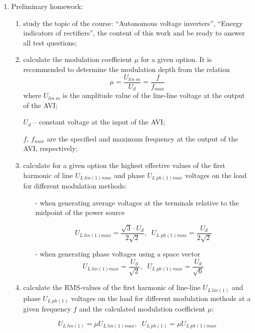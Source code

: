 \documentclass[a4paper,14pt]{article}
\begin{document}
\begin{enumerate}
\item Preliminary homework:
\begin{enumerate}
\item study the topic of the course: “Autonomous voltage inverters”, “Energy indicators of rectifiers”, the content of this work and be ready to answer all test questions;
\item calculate the modulation coefficient $\mu$ for a given option. It is recommended to determine the modulation depth from the relation
\begin{equation}
\mu = \frac{U_{lin\;m}}{U_d} = \frac{f}{f_{max}}
\end{equation}
where $U_{lin\;m}$ is the amplitude value of the line-line voltage at the output of the AVI;

$U_d$ -- constant voltage at the input of the AVI;

$f$, $f_{max}$ are the specified and maximum frequency at the output of the AVI, respectively;

\item calculate for a given option the highest effective values of the first harmonic of line $U_{L\:lin(1)max}$ and phase $U_{L\:ph(1)max}$ voltages on the load for different modulation methods:

\begin{itemize}
\item[-] when generating average voltages at the terminals relative to the midpoint of the power source

\begin{equation}
U_{L\:lin(1)max} = \frac{\sqrt{3}\cdot U_d}{2\sqrt{2}}, \;\; U_{L\:ph(1)max} = \frac{U_d}{2\sqrt{2}}
\end{equation}

\item[-] when generating phase voltages using a space vector
\begin{equation}
U_{L\:lin(1)max} = \frac{U_d}{\sqrt{2}}, \;\; U_{L\:ph(1)max} = \frac{U_d}{\sqrt{6}}
\end{equation}

\end{itemize}
\item calculate the RMS-values of the first harmonic of line-line $U_{L\:lin(1)}$ and phase $U_{L\:ph(1)}$ voltages on the load for different modulation methods at a given frequency $f$ and the calculated modulation coefficient $\mu$:

\begin{equation}
U_{L\:lin(1)} = \mu U_{L\:lin(1)max},  \;\; U_{L\:ph(1)} = \mu U_{L\:ph(1)max}  
\end{equation}


\end{enumerate}
\end{enumerate}
\end{document}
